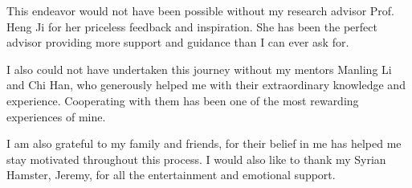 This endeavor would not have been possible without my research advisor Prof. Heng Ji for her priceless feedback and inspiration. She has been the perfect advisor providing more support and guidance than I can ever ask for. 

I also could not have undertaken this journey without my mentors Manling Li and Chi Han, who generously helped me with their extraordinary knowledge and experience. Cooperating with them has been one of the most rewarding experiences of mine.

I am also grateful to my family and friends, for their belief in me has helped me stay motivated throughout this process. I would also like to thank my Syrian Hamster, Jeremy, for all the entertainment and emotional support.